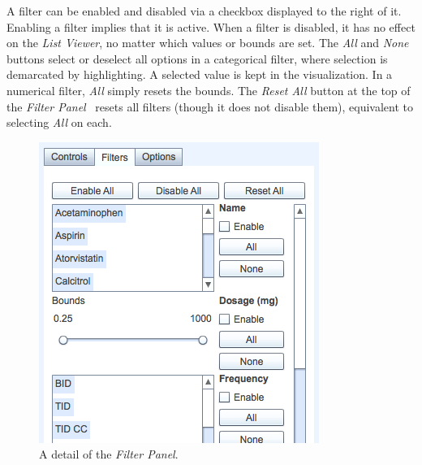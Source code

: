 \documentclass{chi2009}
\newcommand{\ListViewer}{\textit{List Viewer}}
\newcommand{\Filters}{\textit{Filter Panel}}
\begin{document}
A filter can be enabled and disabled via a checkbox displayed to the right of it. Enabling a filter implies that it is active. When a filter is disabled, it has no effect on the \ListViewer, no matter which values or bounds are set. The \textit{All} and \textit{None} buttons select or deselect all options in a categorical filter, where selection is demarcated by highlighting. A selected value is kept in the visualization. In a numerical filter, \textit{All} simply resets the bounds. The \textit{Reset All} button at the top of the \Filters~ resets all filters (though it does not disable them), equivalent to selecting \textit{All} on each.

\begin{figure}[t]
\begin{center}
\includegraphics[width=1\linewidth]{img/filters2.png}
\end{center}
   \caption{A detail of the \Filters.}
   \label{fig:filters}
\end{figure}
\end{document}
